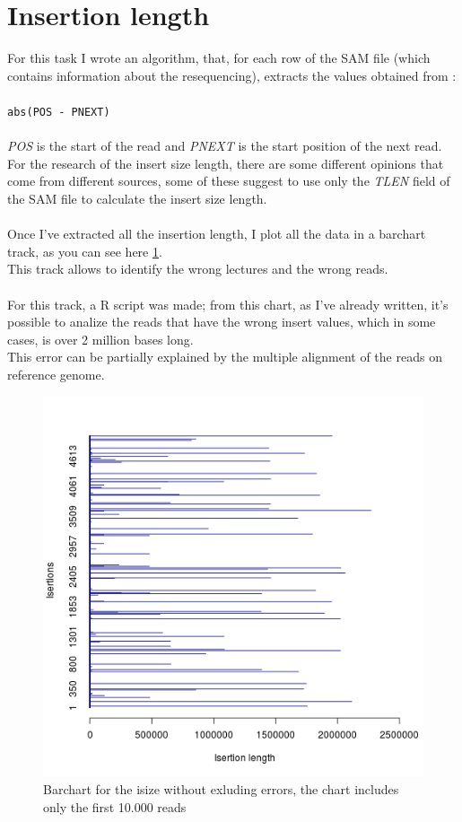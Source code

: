 \section{Insertion length}
For this task I wrote an algorithm, that, for each row of the SAM file (which contains information about the resequencing), extracts the values obtained from :
\\
\\
\verb|abs(POS - PNEXT)|
\\
\\
\emph{POS} is the start of the read and \emph{PNEXT} is the start position of the next read.\\
For the research of the insert size length, there are some different opinions that come from different sources, some of these suggest to use only the \emph{TLEN} field of the SAM file to calculate the insert size length.
\\\\
Once I've extracted all the insertion length, I plot all the data in a barchart track, as you can see here \ref{fig:1}.\\
This track allows to identify the wrong lectures and the wrong reads.
\\\\
For this track, a R script was made; from this chart, as I've already written, it's possible to analize the reads that have the wrong insert values, which in some cases, is over 2 million bases long.\\

This error can be partially explained by the multiple alignment of the reads on reference genome.
\newpage
 \begin{figure}[H]
				\centering
				\includegraphics[scale=0.8]{immagini/r.png}
				\caption{Barchart for the isize without exluding errors, the chart includes only the first 10.000 reads}\label{fig:1}
				\end{figure}

